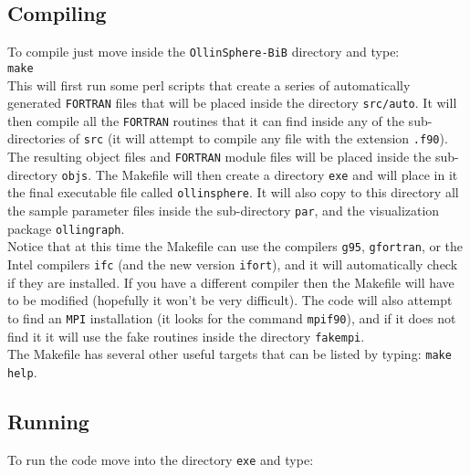 \documentclass[12pt]{article}
\begin{document}
\subsection{Compiling}
\label{sec:compiling}

To compile just move inside the \texttt{OllinSphere-BiB} directory and type: \\

\texttt{make} \\

This will first run some perl scripts that create a series of
automatically generated \texttt{FORTRAN} files that will be placed
inside the directory \texttt{src/auto}.  It will then compile all the
\texttt{FORTRAN} routines that it can find inside any of the
sub-directories of \texttt{src} (it will attempt to compile any file
with the extension \texttt{.f90}). \\

The resulting object files and \texttt{FORTRAN} module files will be
placed inside the sub-directory \texttt{objs}. The Makefile will then
create a directory \texttt{exe} and will place in it the final
executable file called \texttt{ollinsphere}.  It will also copy to
this directory all the sample parameter files inside the sub-directory
\texttt{par}, and the visualization package \texttt{ollingraph}. \\

Notice that at this time the Makefile can use the compilers
\texttt{g95}, \texttt{gfortran}, or the Intel compilers \texttt{ifc}
(and the new version \texttt{ifort}), and it will automatically check
if they are installed. If you have a different compiler then the
Makefile will have to be modified (hopefully it won't be very
difficult). The code will also attempt to find an \texttt{MPI}
installation (it looks for the command \texttt{mpif90}), and if it
does not find it it will use the fake routines inside the directory
\texttt{fakempi}. \\

The Makefile has several other useful targets that can be listed by
typing: \texttt{make help}. \\


\subsection{Running}
\label{sec:running}

To run the code move into the directory \texttt{exe} and type: \\
\end{document}
